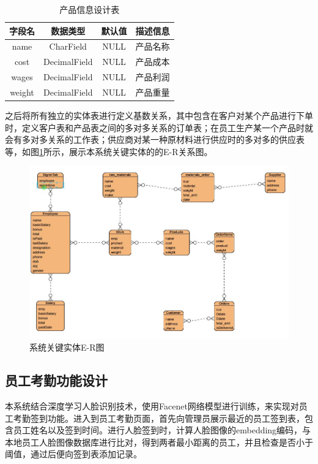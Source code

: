 \begin{table}[H]
    \centering
    \caption{产品信息设计表}
    \label{tab:product}
    \begin{tabular}{cccc}
        \toprule
        字段名 & 数据类型 & 默认值 & 描述信息 \\
        \midrule
        name & CharField & NULL & 产品名称 \\
        cost & DecimalField & NULL & 产品成本 \\
        wages & DecimalField & NULL & 产品利润 \\
        weight & DecimalField & NULL& 产品重量 \\
        \bottomrule
    \end{tabular}
\end{table}

之后将所有独立的实体表进行定义基数关系，其中包含在客户对某个产品进行下单时，定义客户表和产品表之间的多对多关系的订单表；在员工生产某一个产品时就会有多对多关系的工作表；供应商对某一种原材料进行供应时的多对多的供应表等，如图\ref{fig:er}所示，展示本系统关键实体的的E-R关系图。

\begin{figure}[H]
    \centering
    \includegraphics[width=.75\textwidth]{figures/4er.jpg}
    \caption{系统关键实体E-R图}
    \label{fig:er}
\end{figure}

\subsection{员工考勤功能设计}

本系统结合深度学习人脸识别技术，使用Facenet网络模型进行训练，来实现对员工考勤签到功能。进入到员工考勤页面，首先向管理员展示最近的员工签到表，包含员工姓名以及签到时间。进行人脸签到时，计算人脸图像的embedding编码，与本地员工人脸图像数据库进行比对，得到两者最小距离的员工，并且检查是否小于阈值，通过后便向签到表添加记录。

